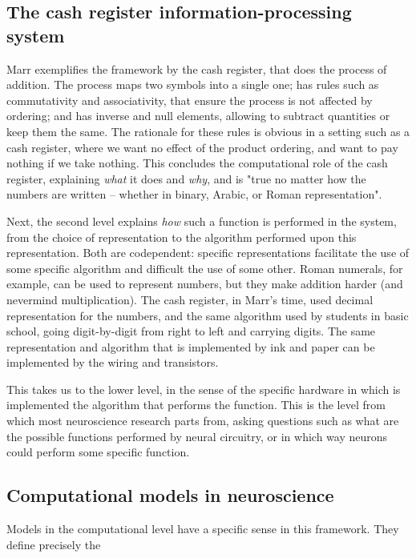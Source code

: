     \subsection{The cash register information-processing system}
    
        Marr exemplifies the framework by the cash register, that does the process of addition. The process maps two symbols into a single one; has rules such as commutativity and associativity, that ensure the process is not affected by ordering; and has inverse and null elements, allowing to subtract quantities or keep them the same. The rationale for these rules is obvious in a setting such as a cash register, where we want no effect of the product ordering, and want to pay nothing if we take nothing. This concludes the computational role of the cash register, explaining \textit{what} it does and \textit{why}, and is "true no matter how the numbers are written -- whether in binary, Arabic, or Roman representation".
        
        Next, the second level explains \textit{how} such a function is performed in the system, from the choice of representation to the algorithm performed upon this representation. Both are codependent: specific representations facilitate the use of some specific algorithm and difficult the use of some other. Roman numerals, for example, can be used to represent numbers, but they make addition harder (and nevermind multiplication). The cash register, in Marr's time, used decimal representation for the numbers, and the same algorithm used by students in basic school, going digit-by-digit from right to left and carrying digits. The same representation and algorithm that is implemented by ink and paper can be implemented by the wiring and transistors.
        
        This takes us to the lower level, in the sense of the specific hardware in which is implemented the algorithm that performs the function. This is the level from which most neuroscience research parts from, asking questions such as what are the possible functions performed by neural circuitry, or in which way neurons could perform some specific function.
    
    \subsection{Computational models in neuroscience}
        
        Models in the computational level have a specific sense in this framework. They define precisely the 
        
